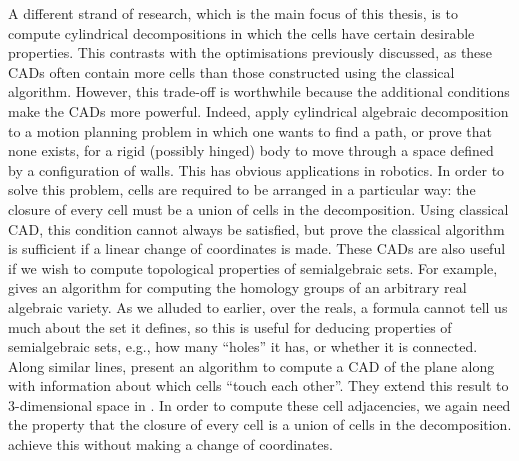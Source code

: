 \documentclass[
]{book}
\theoremstyle{definition}
\theoremstyle{definition}
\theoremstyle{definition}
\theoremstyle{definition}
\theoremstyle{remark}
\begin{document}
A different strand of research, which is the main focus of this thesis, is to compute cylindrical decompositions in which the cells have certain desirable properties. This contrasts with the optimisations previously discussed, as these CADs often contain more cells than those constructed using the classical algorithm. However, this trade-off is worthwhile because the additional conditions make the CADs more powerful.
Indeed, \citet{pianomovers1983} apply cylindrical algebraic decomposition to a motion planning problem in which one wants to find a path, or prove that none exists, for a rigid (possibly hinged) body to move through a space defined by a configuration of walls. This has obvious applications in robotics. In order to solve this problem, cells are required to be arranged in a particular way: the closure of every cell must be a union of cells in the decomposition. Using classical CAD, this condition cannot always be satisfied, but \citet{pianomovers1983} prove the classical algorithm is sufficient if a linear change of coordinates is made.
These CADs are also useful if we wish to compute topological properties of semialgebraic sets. For example, \citet{reif1979} gives an algorithm for computing the homology groups of an arbitrary real algebraic variety. As we alluded to earlier, over the reals, a formula cannot tell us much about the set it defines, so this is useful for deducing properties of semialgebraic sets, e.g., how many ``holes'' it has, or whether it is connected.
Along similar lines, \citet{arnon1984} present an algorithm to compute a CAD of the plane along with information about which cells ``touch each other''. They extend this result to 3-dimensional space in \citep{arnon1987}. In order to compute these cell adjacencies, we again need the property that the closure of every cell is a union of cells in the decomposition. \citet{arnon1987} achieve this without making a change of coordinates.
\end{document}

